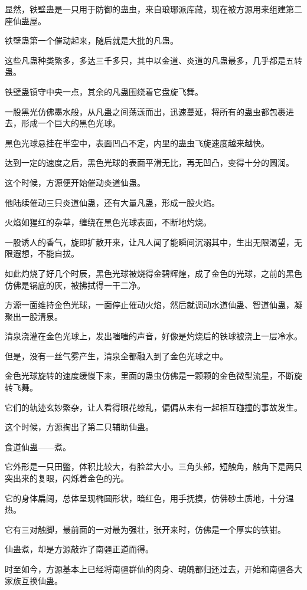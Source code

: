 \begin{this_body}
显然，铁壁蛊是一只用于防御的蛊虫，来自琅琊派库藏，现在被方源用来组建第二座仙蛊屋。

铁壁蛊第一个催动起来，随后就是大批的凡蛊。

这些凡蛊种类繁多，多达三千多只，其中以金道、炎道的凡蛊最多，几乎都是五转蛊。

铁壁蛊镇守中央一点，其余的凡蛊围绕着它盘旋飞舞。

一股黑光仿佛墨水般，从凡蛊之间荡漾而出，迅速蔓延，将所有的蛊虫都包裹进去，形成一个巨大的黑色光球。

黑色光球悬挂在半空中，表面凹凸不定，内里的蛊虫飞旋速度越来越快。

达到一定的速度之后，黑色光球的表面平滑无比，再无凹凸，变得十分的圆润。

这个时候，方源便开始催动炎道仙蛊。

他陆续催动三只炎道仙蛊，还有大量凡蛊，形成一股火焰。

火焰如猩红的杂草，缠绕在黑色光球表面，不断地灼烧。

一股诱人的香气，旋即扩散开来，让凡人闻了能瞬间沉溺其中，生出无限渴望，无限遐想，不能自拔。

如此灼烧了好几个时辰，黑色光球被烧得金碧辉煌，成了金色的光球，之前的黑色仿佛是锅底的灰，被拂拭得一干二净。

方源一面维持金色光球，一面停止催动火焰，然后就调动水道仙蛊、智道仙蛊，凝聚出一股清泉。

清泉浇灌在金色光球上，发出嗤嗤的声音，好像是灼烧后的铁球被浇上一层冷水。

但是，没有一丝气雾产生，清泉全都融入到了金色光球之中。

金色光球旋转的速度缓慢下来，里面的蛊虫仿佛是一颗颗的金色微型流星，不断旋转飞舞。

它们的轨迹玄妙繁杂，让人看得眼花缭乱，偏偏从未有一起相互碰撞的事故发生。

这个时候，方源掏出了第二只辅助仙蛊。

食道仙蛊——煮。

它外形是一只田鳖，体积比较大，有脸盆大小。三角头部，短触角，触角下是两只突出来的复眼，闪烁着金色的光。

它的身体扁阔，总体呈现椭圆形状，暗红色，用手抚摸，仿佛砂土质地，十分温热。

它有三对触脚，最前面的一对最为强壮，张开来时，仿佛是一个厚实的铁钳。

仙蛊煮，却是方源敲诈了南疆正道而得。

时至如今，方源基本上已经将南疆群仙的肉身、魂魄都归还过去，开始和南疆各大家族互换仙蛊。


\end{this_body}
